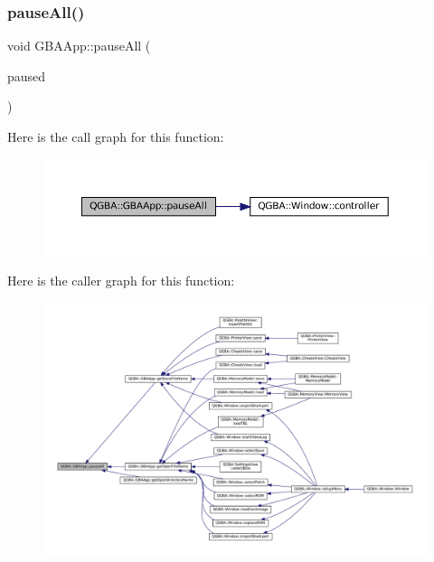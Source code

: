 \mbox{\label{class_q_g_b_a_1_1_g_b_a_app_afad24538ae16442e0b398fb6233e5c08}} 
\subsubsection{\texorpdfstring{pause\+All()}{pauseAll()}}
{\footnotesize\ttfamily void G\+B\+A\+App\+::pause\+All (\begin{DoxyParamCaption}\item[{Q\+List$<$ \mbox{\hyperlink{class_q_g_b_a_1_1_window}{Window}} $\ast$$>$ $\ast$}]{paused }\end{DoxyParamCaption})\hspace{0.3cm}{\ttfamily [private]}}

Here is the call graph for this function\+:
\nopagebreak
\begin{figure}[H]
\begin{center}
\leavevmode
\includegraphics[width=350pt]{class_q_g_b_a_1_1_g_b_a_app_afad24538ae16442e0b398fb6233e5c08_cgraph}
\end{center}
\end{figure}
Here is the caller graph for this function\+:
\nopagebreak
\begin{figure}[H]
\begin{center}
\leavevmode
\includegraphics[width=350pt]{class_q_g_b_a_1_1_g_b_a_app_afad24538ae16442e0b398fb6233e5c08_icgraph}
\end{center}
\end{figure}
\mbox{\label{class_q_g_b_a_1_1_g_b_a_app_a253cf2c502553990bf498bf91433d52a}} 

